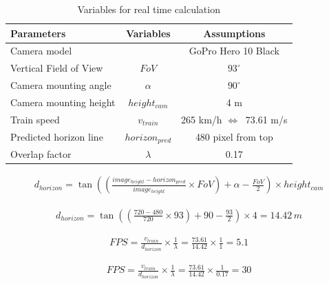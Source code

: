 \begin{table}[H]
    \centering
    \begin{tabular}{|l|c|c|}
        \hline
        \textbf{Parameters} & \textbf{Variables} & \textbf{Assumptions}\\
        \hline
        Camera model & & GoPro Hero 10 Black \cite{goproHero10} \\
        \hline
        Vertical Field of View & $FoV$ & $93^\circ$ \cite{goproHero10} \\
        \hline
        Camera mounting angle & $\alpha$ & $90^\circ$ \\
        \hline
        Camera mounting height & $height_{cam}$ & 4 m \\
        \hline
        Train speed & $v_{train}$ & 265 km/h \cite{geschwindigkeitZugAustria} $ \Leftrightarrow\ $ 73.61 m/s\\
        \hline
        Predicted horizon line & $ horizon_{pred} $ & 480 pixel from top \\
        \hline
        Overlap factor & $\lambda$ & 0.17 \\
        \hline
    \end{tabular}
    \caption{Variables for real time calculation}
    \label{tab:variablesForRealTime}
\end{table}

\begin{align}
    d_{horizon} = \tan \left( \left( \frac{image_{height} - horizon_{pred}}{image_{height}} \times FoV \right) + \alpha - \frac{FoV}{2} \right) \times height_{cam}
    \label{func:dHorizon}
\end{align}

\begin{align}
    d_{horizon} = \tan \left( \left( \frac{720 - 480}{720} \times 93 \right) + 90 - \frac{93}{2} \right) \times 4 = 14.42 \, {m}
    \label{func:dHorizonValues}
\end{align}

\begin{align}
    FPS = \frac{v_{train}}{d_{horizon}} \times \frac{1}{\lambda} = \frac{73.61}{14.42} \times \frac{1}{1} = 5.1
    \label{func:FPSValues}
\end{align}

\begin{align}
    FPS = \frac{v_{train}}{d_{horizon}} \times \frac{1}{\lambda} = \frac{73.61}{14.42} \times \frac{1}{0.17} = 30
    \label{func:FPSValuesOverlap}
\end{align}

